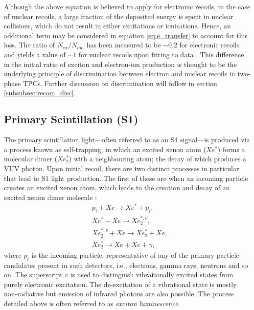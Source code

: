 Although the above equation is believed to apply for electronic recoils, in the case of nuclear recoils, a large fraction of the deposited energy is spent in nuclear collisions, which do not result in either excitations or ionisations. Hence, an additional term may be considered in equation \ref{eq:e_transfer} to account for this loss. The ratio of $N_{ex}/N_{ion}$ has been measured to be $\sim0.2$ for electronic recoils and yields a value of $\sim1$ for nuclear recoils upon fitting to data \cite{xenon_physics, Dahl}. This difference in the initial ratio of exciton and electron-ion production is thought to be the underlying principle of discrimination between electron and nuclear recoils in two-phase TPCs. Further discussion on discrimination will follow in section \ref{subsubsec:recom_disc}.


\subsection{Primary Scintillation (S1)}
\label{subsec:s1}

The primary scintillation light---often referred to as an S1 signal---is produced via a process known as self-trapping, in which an excited xenon atom ($Xe^{\ast}$) forms a molecular dimer ($Xe^{\ast}_{2}$) with a neighbouring atom; the decay of which produces a VUV photon. Upon initial recoil, there are two distinct processes in particular that lead to S1 light production. The first of these are when an incoming particle creates an excited xenon atom, which leads to the creation and decay of an excited xenon dimer molecule \cite{xenon_physics}:
%
\begin{align} \label{eq:exciton_luminescence}
    &p_{i} + Xe \rightarrow Xe^{\ast} + p_{i}, \\
    &Xe^{\ast} + Xe \rightarrow Xe^{\ast, v}_{2}, \\
    &Xe^{\ast, v}_{2} + Xe \rightarrow Xe^{\ast}_{2} + Xe, \\
    &Xe^{\ast}_{2} \rightarrow  Xe +  Xe + \gamma,
\end{align}
%
where $p_{i}$ is the incoming particle, representative of any of the primary particle candidates present in such detectors, i.e., electrons, gamma rays, neutrons and so on. The superscript $v$ is used to distinguish vibrationally excited states from purely electronic excitation. The de-excitation of a vibrational state is mostly non-radiative but emission of infrared photons are also possible. The process detailed above is often referred to as \textit{exciton luminescence}.

